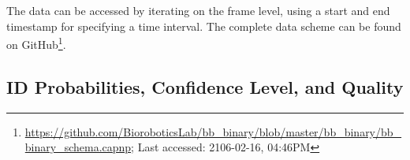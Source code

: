 The data can be accessed by iterating on the frame level, using a start and end time\-stamp for specifying a time interval. The complete data scheme can be found on GitHub\footnote{\url{https://github.com/BioroboticsLab/bb_binary/blob/master/bb_binary/bb_binary_schema.capnp}; Last accessed: 2106-02-16, 04:46PM}. 



\subsection{ID Probabilities, Confidence Level, and Quality}
\label{subsec:confidence}

